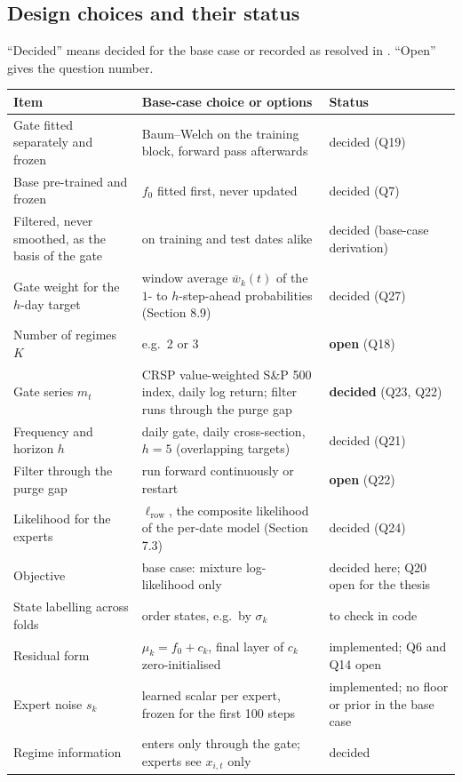 \subsection{Design choices and their status}
``Decided'' means decided for the base case or recorded as resolved in . ``Open'' gives the question number.
\begin{center}
\small\renewcommand{\arraystretch}{1.3}
\begin{tabularx}{\textwidth}{@{}p{4.2cm}Xp{3.3cm}@{}}
\toprule
Item & Base-case choice or options & Status \\
\midrule
Gate fitted separately and frozen & Baum--Welch on the training block, forward pass afterwards & decided (Q19) \\
Base pre-trained and frozen & $f_0$ fitted first, never updated & decided (Q7) \\
Filtered, never smoothed, as the basis of the gate & on training and test dates alike & decided (base-case derivation) \\
Gate weight for the $h$-day target & window average $\bar w_k(t)$ of the $1$- to $h$-step-ahead probabilities (Section 8.9) & decided (Q27) \\
Number of regimes $K$ & e.g.\ 2 or 3 & \textbf{open} (Q18) \\
Gate series $m_t$ & CRSP value-weighted S\&P 500 index, daily log return; filter runs through the purge gap & \textbf{decided} (Q23, Q22) \\
Frequency and horizon $h$ & daily gate, daily cross-section, $h=5$ (overlapping targets) & decided (Q21) \\
Filter through the purge gap & run forward continuously or restart & \textbf{open} (Q22) \\
Likelihood for the experts & $\ell_{\text{row}}$, the composite likelihood of the per-date model (Section 7.3) & decided (Q24) \\
Objective & base case: mixture log-likelihood only & decided here; Q20 open for the thesis \\
State labelling across folds & order states, e.g.\ by $\sigma_k$ & to check in code \\
Residual form & $\mu_k=f_0+c_k$, final layer of $c_k$ zero-initialised & implemented; Q6 and Q14 open \\
Expert noise $s_k$ & learned scalar per expert, frozen for the first 100 steps & implemented; no floor or prior in the base case \\
Regime information & enters only through the gate; experts see $x_{i,t}$ only & decided \\

\end{tabularx}
\end{center}
